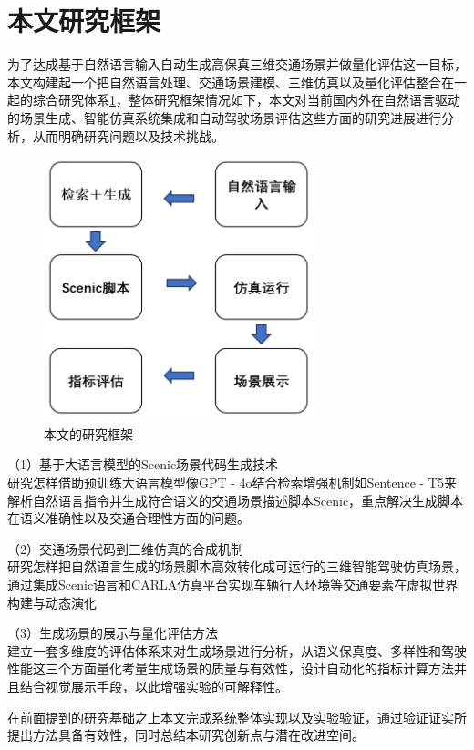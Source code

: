 \section{本文研究框架}

为了达成基于自然语言输入自动生成高保真三维交通场景并做量化评估这一目标，本文构建起一个把自然语言处理、交通场景建模\cite{du2025scene}、三维仿真以及量化评估整合在一起的综合研究体系\ref{fig:research_framework}，整体研究框架情况如下，本文对当前国内外在自然语言驱动的场景生成、智能仿真系统集成和自动驾驶场景评估这些方面的研究进展进行分析，从而明确研究问题以及技术挑战。
\begin{figure}[H]
	\centering
	\includegraphics[width=0.7\textwidth]{../images/研究架构图.pdf} 
	\caption{本文的研究框架}
	\label{fig:research_framework}
\end{figure}


（1）基于大语言模型的Scenic场景代码生成技术 \\
研究怎样借助预训练大语言模型像GPT - 4o结合检索增强机制如Sentence - T5来解析自然语言指令并生成符合语义的交通场景描述脚本Scenic，重点解决生成脚本在语义准确性以及交通合理性方面的问题。

（2）交通场景代码到三维仿真的合成机制 \\
研究怎样把自然语言生成的场景脚本高效转化成可运行的三维智能驾驶仿真场景，通过集成Scenic语言和CARLA仿真平台实现车辆行人环境等交通要素在虚拟世界构建与动态演化

（3）生成场景的展示与量化评估方法 \\
建立一套多维度的评估体系来对生成场景进行分析，从语义保真度、多样性和驾驶性能这三个方面量化考量生成场景的质量与有效性，设计自动化的指标计算方法并且结合视觉展示手段，以此增强实验的可解释性。


在前面提到的研究基础之上本文完成系统整体实现以及实验验证，通过验证证实所提出方法具备有效性，同时总结本研究创新点与潜在改进空间。
